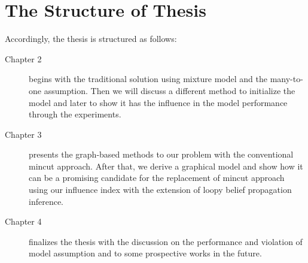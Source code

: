 \section{The Structure of Thesis}
Accordingly, the thesis is structured as follows:
\begin{description}
	\item[Chapter 2] begins with the traditional solution using mixture model and the many-to-one assumption. Then we will discuss a different method to initialize the model and later to show it has the influence in the model performance through the experiments.
	
	\item[Chapter 3] presents the graph-based methods to our problem with the conventional mincut approach. After that, we derive a graphical model and show how it can be a promising candidate for the replacement of mincut approach using our influence index with the extension of loopy belief propagation inference.
	
	\item[Chapter 4] finalizes the thesis with the discussion on the performance and violation of model assumption and to some prospective works in the future.
\end{description}